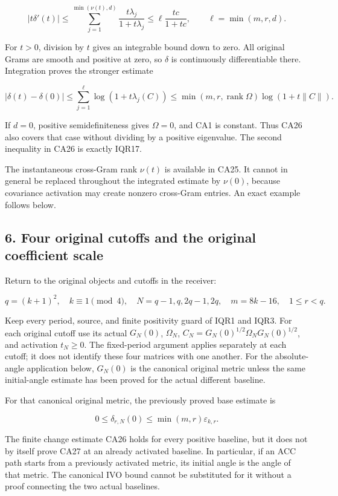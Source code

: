 \documentclass[11pt]{article}
\begin{document}
\[
|t\delta'(t)|
\le\sum_{j=1}^{\min(\nu(t),d)}\frac{t\lambda_j}{1+t\lambda_j}
\le\ell\frac{tc}{1+tc},
\qquad \ell=\min(m,r,d).
\tag{CA25}
\]

For \(t>0\), division by \(t\) gives an integrable bound down to zero. All original Grams are smooth and positive at zero, so \(\delta\) is continuously differentiable there. Integration proves the stronger estimate

\[
\boxed{
|\delta(t)-\delta(0)|
\le\sum_{j=1}^{\ell}\log(1+t\lambda_j(C))
\le\min(m,r,\operatorname{rank}\Omega)\log(1+t\|C\|).
}
\tag{CA26}
\]

If \(d=0\), positive semidefiniteness gives \(\Omega=0\), and CA1 is constant. Thus CA26 also covers that case without dividing by a positive eigenvalue. The second inequality in CA26 is exactly IQR17.

The instantaneous cross-Gram rank \(\nu(t)\) is available in CA25. It cannot in general be replaced throughout the integrated estimate by \(\nu(0)\), because covariance activation may create nonzero cross-Gram entries. An exact example follows below.

\subsection{6. Four original cutoffs and the original coefficient scale}\label{four-original-cutoffs-and-the-original-coefficient-scale}

Return to the original objects and cutoffs in the receiver:

\[
q=(k+1)^2,\quad k\equiv1\pmod4,\quad
N=q-1,q,2q-1,2q,\quad
m=8k-16,\quad 1\le r<q.
\]

Keep every period, source, and finite positivity guard of IQR1 and IQR3. For each original cutoff use its actual \(G_N(0)\), \(\Omega_N\), \(C_N=G_N(0)^{1/2}\Omega_NG_N(0)^{1/2}\), and activation \(t_N\ge0\). The fixed-period argument applies separately at each cutoff; it does not identify these four matrices with one another. For the absolute-angle application below, \(G_N(0)\) is the canonical original metric unless the same initial-angle estimate has been proved for the actual different baseline.

For that canonical original metric, the previously proved base estimate is

\[
0\le\delta_{r,N}(0)\le\min(m,r)\varepsilon_{k,r}.
\tag{CA27}
\]

The finite change estimate CA26 holds for every positive baseline, but it does not by itself prove CA27 at an already activated baseline. In particular, if an ACC path starts from a previously activated metric, its initial angle is the angle of that metric. The canonical IVO bound cannot be substituted for it without a proof connecting the two actual baselines.
\end{document}
